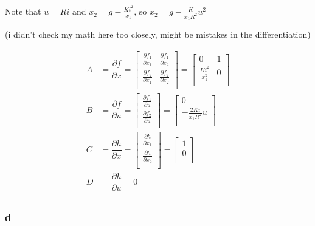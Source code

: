 \documentclass[11pt]{article}
\begin{document}
Note that $u = Ri$ and $\dot x_2 = g - \frac{Ki^2}{x_1}$, so $\dot x_2 = g - \frac{K}{x_1 R^2} u^2$

(i didn't check my math here too closely, might be mistakes in the differentiation)

\begin{align*}
    A &= \dfrac{\partial f}{\partial x} =
    \begin{bmatrix}
        \frac{\partial f_1}{\partial x_1} & \frac{\partial f_1}{\partial x_2} \\    
        \frac{\partial f_2}{\partial x_1} & \frac{\partial f_2}{\partial x_2} \\ 
    \end{bmatrix} = 
    \begin{bmatrix}
        0 & 1 \\
        \frac{Ki^2}{x_1^2} & 0 \\
    \end{bmatrix} \\
    B &= \dfrac{\partial f}{\partial u} =
    \begin{bmatrix}
        \frac{\partial f_1}{\partial u} \\
        \frac{\partial f_2}{\partial u} \\    
    \end{bmatrix} =
    \begin{bmatrix}
        0 \\
        -\frac{2Ki}{x_1 R^2} u \\    
    \end{bmatrix}\\
    C &= \dfrac{\partial h}{\partial x} = \begin{bmatrix}
        \frac{\partial h}{\partial x_1} \\
        \frac{\partial h}{\partial x_2} \\
    \end{bmatrix} =
    \begin{bmatrix}
        1 \\
        0 \\    
    \end{bmatrix}\\
    D &= \dfrac{\partial h}{\partial u} = 0\\
\end{align*}

\subsubsection{d}
\end{document}
